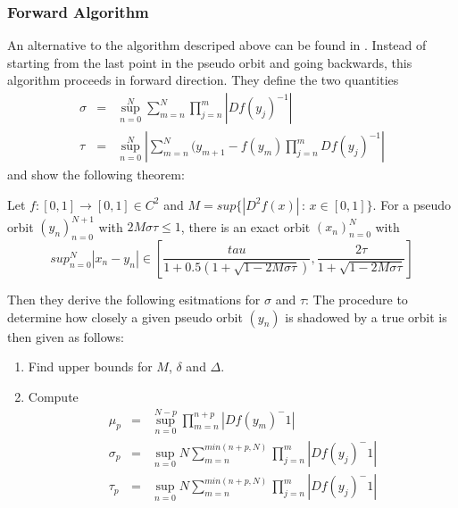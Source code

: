     \subsubsection{Forward Algorithm}
    An alternative to the algorithm descriped above can be found in \cite{chow1991}.
    Instead of starting from the last point in the pseudo orbit and going backwards, this algorithm proceeds in forward direction.
    They define the two quantities
    \begin{eqnarray*}
    \sigma & = & \sup^N_{n=0} \sum_{m=n}^N  \prod_{j=n}^{m} | Df(y_j)^{-1} |  \\
    \tau & = & \sup^N_{n=0} | \sum_{m=n}^N (y_{m+1}-f(y_m)\prod_{j=n}^{m} Df(y_j)^{-1}  |
    \end{eqnarray*}
    and show the following theorem:
    \begin{theorem}
    Let $f: [0,1] \to [0,1] \in C^2$ and $M = sup \{|D^2f(x)| \,:\, x \in [0,1] \}$.
    For a pseudo orbit $(y_n)_{n=0}^{N+1}$ with $2M\sigma\tau \leq 1$, there is an exact orbit $(x_n)_{n=0}^N$  with 
    $$sup_{n=0}^N |x_n - y_n| \in [\frac{tau}{1+0.5(1+\sqrt{1-2M\sigma \tau})}, \frac{2\tau}{1+\sqrt {1-2M\sigma \tau}}]$$
    \end{theorem}
    Then they derive the following esitmations for $\sigma$ and $\tau$:
    The procedure to determine how closely a given pseudo orbit $(y_n)$ is shadowed by a true orbit is then given as follows:
    \begin{enumerate}
      \item Find upper bounds for $M$, $\delta$ and $\Delta$.
      \item Compute 
      \begin{eqnarray*}
      \mu_p &=& \sup_{n=0}^{N-p} \prod_{m=n}^{n+p} |Df(y_m)^-1| \\
      \sigma_p &=& \sup_{n=0}{N} \sum_{m=n}^{min(n+p,N)} \prod_{j=n}^{m} |Df(y_j)^-1| \\
      \tau_p &=& \sup_{n=0}{N} \sum_{m=n}^{min(n+p,N)} \prod_{j=n}^{m} |Df(y_j)^-1| \\
      \end{eqnarray*}
    \end{enumerate}
